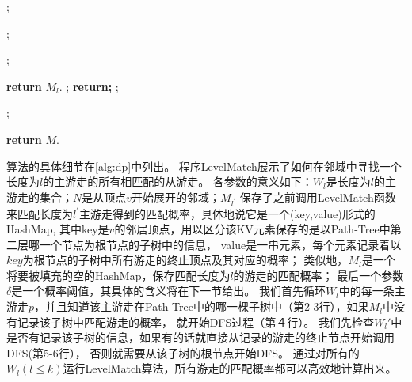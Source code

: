 \documentclass[master]{njuthesis}
\begin{document}
\begin{algorithm}[h]
\label{alg:dp}
\begin{algorithmic}[1]
		;
				
						\State \parbox[t]{\dimexpr\linewidth-\algorithmicindent} {;}	
					\Else 
								\State \parbox[t]{\dimexpr\linewidth-\algorithmicindent}{;}
							\EndFor
						\EndFor
					\EndIf			
				
			\EndFor
	\EndFor
	\State \textbf{return} $M_l$.
\EndProcedure
{}
	;
		\State \textbf{return;} 
	\EndIf
		;   %
	\Else
			\State \parbox[t]{\dimexpr\linewidth-\algorithmicindent} {;}
		\EndFor
	\EndIf
	\State \textbf{return} $M$.
\EndProcedure
\end{algorithmic}
\end{algorithm}
算法的具体细节在\ref{alg:dp}中列出。
程序LevelMatch展示了如何在邻域中寻找一个长度为$l$的主游走的所有相匹配的从游走。
各参数的意义如下：$W_l$是长度为$l$的主游走的集合；$N$是从顶点$v$开始展开的邻域；$M_{l^\prime}$ 
保存了之前调用LevelMatch函数来匹配长度为$l^\prime$主游走得到的匹配概率，具体地说它是一个(key,value)形式的HashMap,
其中key是$v$的邻居顶点，用以区分该KV元素保存的是以Path-Tree中第二层哪一个节点为根节点的子树中的信息，
value是一串元素，每个元素记录着以$key$为根节点的子树中所有游走的终止顶点及其对应的概率；
类似地，$M_l$是一个将要被填充的空的HashMap，保存匹配长度为$l$的游走的匹配概率；
最后一个参数$\delta$是一个概率阈值，其具体的含义将在下一节给出。
我们首先循环$W_l$中的每一条主游走$p$，并且知道该主游走在Path-Tree中的哪一棵子树中（第2-3行），如果$M_l$中没有记录该子树中匹配游走的概率，
就开始DFS过程（第４行）。
我们先检查$W_l{\prime}$中是否有记录该子树的信息，如果有的话就直接从记录的游走的终止节点开始调用DFS(第5-6行），
否则就需要从该子树的根节点开始DFS。
通过对所有的$W_l (l \leq k)$运行LevelMatch算法，所有游走的匹配概率都可以高效地计算出来。
\end{document}
